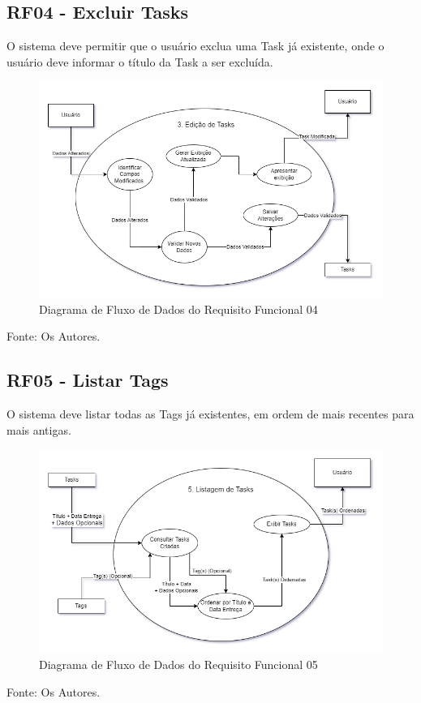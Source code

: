 \documentclass[a4paper,12pt]{article}
\begin{document}
\pagebreak
\subsection{RF04 - Excluir Tasks}
O sistema deve permitir que o usuário exclua uma {Task} já existente, onde o usuário deve informar o título 
da {Task} a ser excluída.
\begin{figure}[H]
	\centering
	\includegraphics[scale=0.45]{DFDs/RF03.drawio.png}
	\caption{Diagrama de Fluxo de Dados do Requisito Funcional 04}
\end{figure}
\noindent Fonte: Os Autores.

\pagebreak
\subsection{RF05 - Listar Tags}
O sistema deve listar todas as {Tags} já existentes, em ordem de mais recentes para mais antigas.
\begin{figure}[H]
	\centering
	\includegraphics[scale=0.45]{DFDs/RF05.drawio.png}
	\caption{Diagrama de Fluxo de Dados do Requisito Funcional 05}
\end{figure}
\noindent Fonte: Os Autores.
\end{document}
